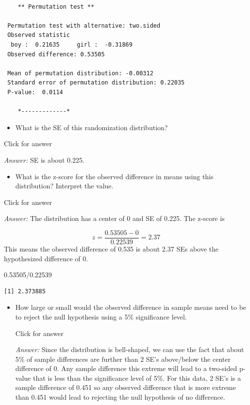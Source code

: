 \documentclass[
]{book}
\newenvironment{Shaded}{\begin{snugshade}}{\end{snugshade}}
\newcommand{\FloatTok}[1]{\textcolor[rgb]{0.00,0.00,0.81}{#1}}
\newcommand{\SpecialCharTok}[1]{\textcolor[rgb]{0.00,0.00,0.00}{#1}}
\providecommand{\tightlist}{%
  \setlength{\itemsep}{0pt}\setlength{\parskip}{0pt}}
\begin{document}
\begin{verbatim}

    ** Permutation test **

 Permutation test with alternative: two.sided 
 Observed statistic
  boy :  0.21635     girl :  -0.31869 
 Observed difference: 0.53505 

 Mean of permutation distribution: -0.00312 
 Standard error of permutation distribution: 0.22035 
 P-value:  0.0114 

    *-------------*
\end{verbatim}

\begin{itemize}
\tightlist
\item
  What is the SE of this randomization distribution?
\end{itemize}

Click for answer

\emph{Answer:} SE is about 0.225.

\vspace*{.5in}

\begin{itemize}
\tightlist
\item
  What is the z-score for the observed difference in means using this distribution? Interpret the value.
  \vspace*{.5in}
\end{itemize}

Click for answer

\emph{Answer:} The distribution has a center of 0 and SE of 0.225. The z-score is

\[
z = \dfrac{0.53505 - 0}{0.22539 } = 2.37
\]
This means the observed difference of 0.535 is about 2.37 SEs above the hypothesized difference of 0.

\begin{Shaded}
\begin{Highlighting}[]
\FloatTok{0.53505}\SpecialCharTok{/}\FloatTok{0.22539} 
\end{Highlighting}
\end{Shaded}

\begin{verbatim}
[1] 2.373885
\end{verbatim}

\begin{itemize}
\tightlist
\item
  How large or small would the observed difference in sample means need to be to reject the null hypothesis using a 5\% significance level.

  Click for answer

  \emph{Answer:} Since the distribution is bell-shaped, we can use the fact that about 5\% of sample differences are further than 2 SE's above/below the center difference of 0. Any sample difference this extreme will lead to a two-sided p-value that is less than the significance level of 5\%. For this data, 2 SE's is a sample difference of 0.451 so any observed difference that is more extreme than 0.451 would lead to rejecting the null hypothesis of no difference.
\end{itemize}
\end{document}
